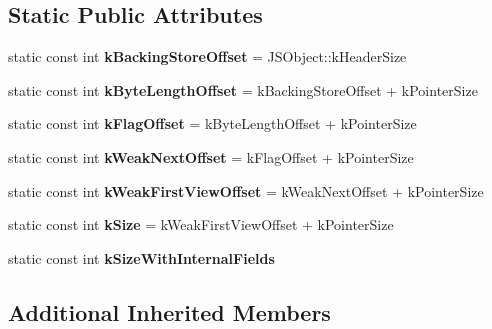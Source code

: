 \subsection*{Static Public Attributes}
\begin{DoxyCompactItemize}
\item 
\hypertarget{classv8_1_1internal_1_1_j_s_array_buffer_ae9a6c12ce71042c8b7a96e0907589777}{}static const int {\bfseries k\+Backing\+Store\+Offset} = J\+S\+Object\+::k\+Header\+Size\label{classv8_1_1internal_1_1_j_s_array_buffer_ae9a6c12ce71042c8b7a96e0907589777}

\item 
\hypertarget{classv8_1_1internal_1_1_j_s_array_buffer_a42dfdf6903db949329ac32a9e814b506}{}static const int {\bfseries k\+Byte\+Length\+Offset} = k\+Backing\+Store\+Offset + k\+Pointer\+Size\label{classv8_1_1internal_1_1_j_s_array_buffer_a42dfdf6903db949329ac32a9e814b506}

\item 
\hypertarget{classv8_1_1internal_1_1_j_s_array_buffer_ac468ac67cfa2d3f6c9054937b821ac91}{}static const int {\bfseries k\+Flag\+Offset} = k\+Byte\+Length\+Offset + k\+Pointer\+Size\label{classv8_1_1internal_1_1_j_s_array_buffer_ac468ac67cfa2d3f6c9054937b821ac91}

\item 
\hypertarget{classv8_1_1internal_1_1_j_s_array_buffer_ae8bf76ce8a3bb7b447a8d0f8e060f56b}{}static const int {\bfseries k\+Weak\+Next\+Offset} = k\+Flag\+Offset + k\+Pointer\+Size\label{classv8_1_1internal_1_1_j_s_array_buffer_ae8bf76ce8a3bb7b447a8d0f8e060f56b}

\item 
\hypertarget{classv8_1_1internal_1_1_j_s_array_buffer_aa45c56ce8d7b45f71c4ce4bc1645202f}{}static const int {\bfseries k\+Weak\+First\+View\+Offset} = k\+Weak\+Next\+Offset + k\+Pointer\+Size\label{classv8_1_1internal_1_1_j_s_array_buffer_aa45c56ce8d7b45f71c4ce4bc1645202f}

\item 
\hypertarget{classv8_1_1internal_1_1_j_s_array_buffer_a2c244a25548a8a223c20bc0ac4fbd827}{}static const int {\bfseries k\+Size} = k\+Weak\+First\+View\+Offset + k\+Pointer\+Size\label{classv8_1_1internal_1_1_j_s_array_buffer_a2c244a25548a8a223c20bc0ac4fbd827}

\item 
static const int {\bfseries k\+Size\+With\+Internal\+Fields}
\end{DoxyCompactItemize}
\subsection*{Additional Inherited Members}


